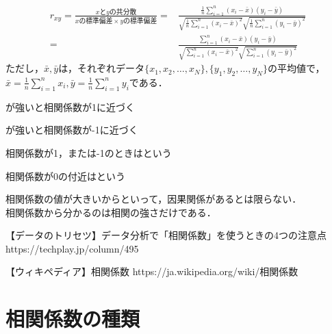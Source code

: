 {
  \begin{align*}
    r_{xy} = \frac{xとyの共分散}{xの標準偏差\times yの標準偏差}
      =&\frac{\frac{1}{n}\sum_{i=1}^n(x_i-\bar{x})(y_i-\bar{y})}
             {\sqrt{\frac{1}{n}\sum_{i=1}^n(x_i-\bar{x})^2}
              \sqrt{\frac{1}{n}\sum_{i=1}^n(y_i-\bar{y})^2}}\\
      =&\frac{\sum_{i=1}^n(x_i-\bar{x})(y_i-\bar{y})}
             {\sqrt{\sum_{i=1}^n(x_i-\bar{x})^2}
              \sqrt{\sum_{i=1}^n(y_i-\bar{y})^2}}
  \end{align*}
  ただし，$\bar{x}, \bar{y}$は，それぞれデータ$\{x_1,x_2,\dots,x_N\},
  \{y_1,y_2,\dots,y_N\}$の平均値で，
  $\bar{x}=\frac{1}{n}\sum_{i=1}^n x_i,
   \bar{y}=\frac{1}{n}\sum_{i=1}^n y_i$である．
}

{
  \MyEnums
  {
    \item {}が強いと相関係数が1に近づく
    \item {}が強いと相関係数が-1に近づく
    \item 相関係数が1，または-1のときはという
    \item 相関係数が0の付近はという
  }
  相関係数の値が大きいからといって，因果関係があるとは限らない．\\
  相関係数から分かるのは相関の強さだけである．
}

{
  \MyRef
  {【データのトリセツ】データ分析で「相関係数」を使うときの4つの注意点}
  {https://techplay.jp/column/495}
}

\MyFrame{}
{
  \MyRef
  {【ウィキペディア】相関係数}
  {https://ja.wikipedia.org/wiki/相関係数}
}

\MyFrame{}
{
  \MyProblem
  {
  }
}

\MyFrame{}
{
  \MySolution
  {
  }
}

\section{相関係数の種類}

